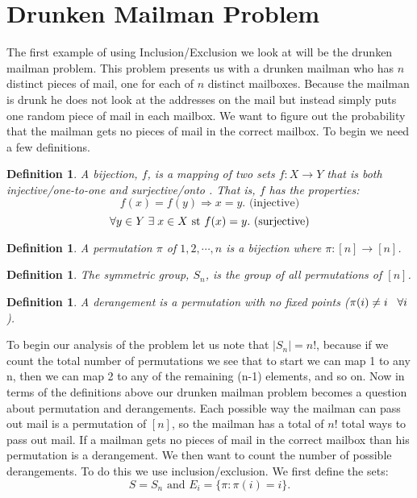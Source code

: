 \documentclass[11pt]{article}
\newtheorem{definition}[theorem]{Definition}
\begin{document}
\section{Drunken Mailman Problem}
The first example of using Inclusion/Exclusion we look at will be the drunken mailman problem. This problem presents us with a drunken mailman who has $n$ distinct pieces of mail, one for each of $n$ distinct mailboxes. Because the mailman is drunk he does not look at the addresses on the mail but instead simply puts one random piece of mail in each mailbox. We want to figure out the probability that the mailman gets no pieces of mail in the correct mailbox. To begin we need a few definitions.
\begin{definition}
A bijection, $f$, is a mapping of two sets $f:X\rightarrow Y$ that is both injective/one-to-one and surjective/onto . That is, $f$ has the properties:
	\[f(x) = f(y) \Rightarrow x=y. \mbox{ (injective)} \]
	\[\forall y \in Y \hspace{1mm} \exists \hspace{1mm} x \in X \mbox{ st } f(x)=y. \mbox{ (surjective)}\]
\end{definition}
\begin{definition}
A permutation $\pi$ of $1,2,\cdots,n$ is a bijection where $\pi: [n]\rightarrow[n]$.
\end{definition}
\begin{definition}
The symmetric group, $S_n$, is the group of all permutations of $[n]$.
\end{definition}
\begin{definition}
A derangement is a permutation with no fixed points ($\pi(i)\neq i \hspace{3mm} \forall i$).
\end{definition}
To begin our analysis of the problem let us note that $|S_n|=n!$, because if we count the total number of permutations we see that to start we can map 1 to any n, then we can map 2 to any of the remaining (n-1) elements, and so on. Now in terms of the definitions above our drunken mailman problem becomes a question about permutation and derangements. Each possible way the mailman can pass out mail is a permutation of $[n]$, so the mailman has a total of $n!$ total ways to pass out mail. If a mailman gets no pieces of mail in the correct mailbox than his permutation is a derangement. We then want to count the number of possible derangements. To do this we use inclusion/exclusion. We first define the sets:
	\[S=S_n \mbox{ and } E_i = \{\pi : \pi(i)=i \}.\]
\end{document}
